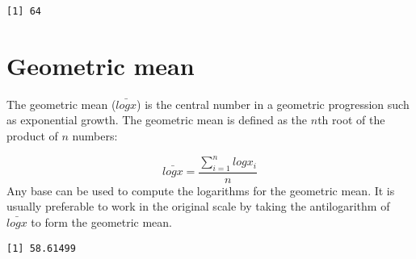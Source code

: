 \documentclass[]{book}
\newenvironment{Shaded}{\begin{snugshade}}{\end{snugshade}}
\newcommand{\KeywordTok}[1]{\textcolor[rgb]{0.13,0.29,0.53}{\textbf{#1}}}
\newcommand{\CommentTok}[1]{\textcolor[rgb]{0.56,0.35,0.01}{\textit{#1}}}
\newcommand{\OperatorTok}[1]{\textcolor[rgb]{0.81,0.36,0.00}{\textbf{#1}}}
\newcommand{\NormalTok}[1]{#1}
\theoremstyle{definition}
\theoremstyle{definition}
\theoremstyle{definition}
\theoremstyle{remark}
\begin{document}
\begin{verbatim}
[1] 64
\end{verbatim}

\section{Geometric mean}\label{geometric-mean}

The geometric mean (\(\bar{logx}\)) is the central number in a geometric
progression such as exponential growth. The geometric mean is defined as
the \({n}\)th root of the product of \({n}\) numbers:

\[\bar{logx}=\frac{\sum_{i=1}^nlogx_{i}}{n}\] Any base can be used to
compute the logarithms for the geometric mean. It is usually preferable
to work in the original scale by taking the antilogarithm of
\(\bar{logx}\) to form the geometric mean.

\begin{Shaded}
\end{Shaded}

\begin{verbatim}
[1] 58.61499
\end{verbatim}


\end{document}
